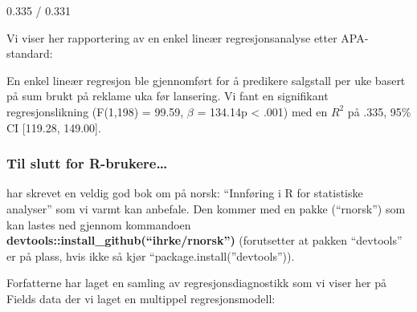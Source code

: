\documentclass[
]{article}
\begin{document}
0.335 / 0.331

Vi viser her rapportering av en enkel lineær regresjonsanalyse etter APA-standard:

En enkel lineær regresjon ble gjennomført for å predikere salgstall per uke basert på sum brukt på reklame uka før lansering. Vi fant en signifikant regresjonslikning (F(1,198) = 99.59, \(\beta\) = 134.14p \textless{} .001) med en \(R^2\) på .335, 95\% CI {[}119.28, 149.00{]}.

\hypertarget{til-slutt-for-r-brukere}{%
\subsubsection{Til slutt for R-brukere\ldots{}}\label{til-slutt-for-r-brukere}}

\citet{mehmetogluInnforingStatistiskeDataanalyser2020} har skrevet en veldig god bok om på norsk: ``Innføring i R for statistiske analyser'' som vi varmt kan anbefale. Den kommer med en pakke (``rnorsk'') som kan lastes ned gjennom kommandoen \textbf{devtools::install\_github(``ihrke/rnorsk'')} (forutsetter at pakken ``devtools'' er på plass, hvis ikke så kjør ``package.install(''devtools'')).

Forfatterne har laget en samling av regresjonsdiagnostikk som vi viser her på Fields data der vi laget en multippel regresjonsmodell:
\end{document}
